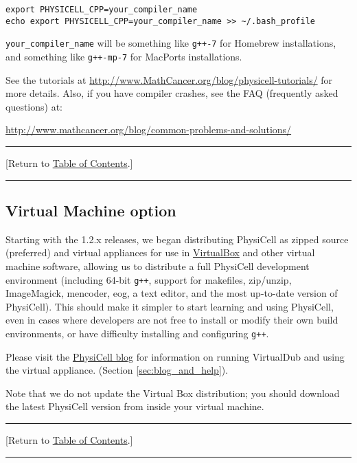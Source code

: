 \documentclass[12pt]{article}
\renewcommand{\v}{\verb}
\newcommand{\blue}[1]{\textcolor{blue}{#1}}
\newcommand{\DONE}{}%
\newcommand{\TOClink}{\begin{center}\hrule\vskip-5pt\phantom{.}\hfill[Return to \hyperlink{TOC}{Table of Contents}.]\hfill\phantom{.}\vskip3pt\hrule\end{center}}
\begin{document}
\begin{verbatim}
export PHYSICELL_CPP=your_compiler_name
echo export PHYSICELL_CPP=your_compiler_name >> ~/.bash_profile
\end{verbatim}

\v|your_compiler_name| will be something like \v|g++-7| for Homebrew installations, 
and something like \v|g++-mp-7| for MacPorts installations. 

See the tutorials at 
\href{http://www.mathcancer.org/blog/physicell-tutorials/}{http://www.MathCancer.org/blog/physicell-tutorials/}
for more details. Also, if you have compiler crashes, see the FAQ (frequently asked questions) at:

\href{http://www.mathcancer.org/blog/common-problems-and-solutions/}{http://www.mathcancer.org/blog/common-problems-and-solutions/}

\TOClink

\subsection{Virtual Machine option \DONE}
Starting with the 1.2.x releases, we began distributing PhysiCell as zipped source (preferred) %
and virtual appliances for use in \href{http://virtualbox.org}{VirtualBox} and other virtual machine software, 
allowing us to distribute a full PhysiCell 
development environment (including 64-bit \v|g++|, support for makefiles, zip/unzip, 
ImageMagick, mencoder, eog, a text editor, and the most up-to-date 
version of PhysiCell). This should make it simpler to start learning and using PhysiCell, even in cases 
where developers are not free to install or modify their own build environments, 
or have difficulty installing and configuring \v|g++|. 

Please visit the 
\href{http:/PhysiCell.MathCancer.org/blog/physicell-tutorials}{PhysiCell blog} 
for information on running VirtualDub and using the virtual appliance. 
(Section \ref{sec:blog_and_help}). 

Note that we do not update the Virtual Box distribution; you should download the latest PhysiCell version from inside your virtual machine. 
\TOClink

%
\end{document}
